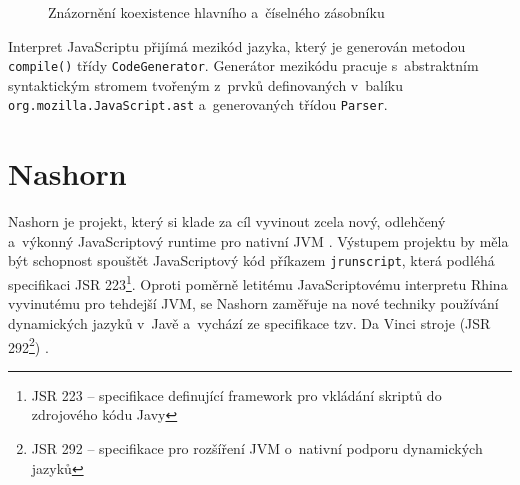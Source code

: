 \begin{figure}[H]
  \begin{center}
    \caption{Znázornění koexistence hlavního a~číselného zásobníku \protect\cite{Bibliography.ZdrojakRhino}}
    \label{Figure.RhinoStack}
  \end{center}
\end{figure}

Interpret JavaScriptu přijímá mezikód jazyka, který je generován metodou \texttt{compile()} třídy \texttt{CodeGenerator}. Generátor mezikódu pracuje s~abstraktním syntaktickým stromem tvořeným z~prvků definovaných v~balíku \texttt{org.mozilla.JavaScript.ast} a~generovaných třídou \texttt{Parser}.

\section{Nashorn}
\label{Chapter.JavaScriptInJavaAnalysis.Nashorn}

Nashorn je projekt, který si klade za cíl vyvinout zcela nový, odlehčený a~výkonný JavaScriptový runtime pro nativní JVM \cite{Bibliography.Nashorn.Project}. Výstupem projektu by měla být schopnost spouštět JavaScriptový kód příkazem \texttt{jrunscript}, která podléhá specifikaci JSR 223\footnote{JSR 223 -- specifikace definující framework pro vkládání skriptů do zdrojového kódu Javy}. Oproti poměrně letitému JavaScriptovému interpretu Rhina vyvinutému pro tehdejší JVM, se Nashorn zaměřuje na nové techniky používání dynamických jazyků v~Javě a~vychází ze specifikace \linebreak tzv. Da Vinci stroje (JSR 292\footnote{JSR 292 -- specifikace pro rozšíření JVM o~nativní podporu dynamických jazyků}) \cite{Bibliography.Nashorn.Project}.

